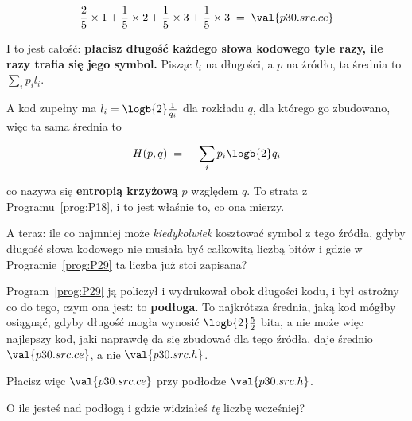 \begin{fr}

\[ \frac25 \times 1 + \frac15 \times 2 + \frac15 \times 3
   + \frac15 \times 3 \;=\; \val{p30.src.ce} \]

I to jest całość: \textbf{płacisz długość każdego słowa kodowego tyle razy,
ile razy trafia się jego symbol.} Pisząc $l_i$ na długości, a $p$ na źródło,
ta średnia to $\sum_i p_i l_i$.

A kod zupełny ma $l_i = \logb{2}\frac{1}{q_i}$ dla rozkładu $q$, dla którego
go zbudowano, więc ta sama średnia to

\[ H(p, q) \;=\; -\sum_i p_i \logb{2} q_i \]

co nazywa się \textbf{entropią krzyżową} $p$ względem $q$. To strata z
Programu~\ref{prog:P18}, i to jest właśnie to, co ona mierzy.

A teraz: ile co najmniej może \emph{kiedykolwiek} kosztować symbol z tego
źródła, gdyby długość słowa kodowego nie musiała być całkowitą liczbą bitów
\dash{} i gdzie w Programie~\ref{prog:P29} ta liczba już stoi zapisana?
\dotline
\nextframe
\end{fr}

\begin{fr}

Program~\ref{prog:P29} ją policzył i wydrukował obok długości kodu, i był
ostrożny co do tego, czym ona jest: to \textbf{podłoga}. To najkrótsza
średnia, jaką kod mógłby osiągnąć, gdyby długość mogła wynosić
$\logb{2}\frac{5}{2}$ bita, a nie może \dash{} więc najlepszy kod, jaki
naprawdę da się zbudować dla tego źródła, daje średnio $\val{p30.src.ce}$, a
nie $\val{p30.src.h}$.

Płacisz więc $\val{p30.src.ce}$ przy podłodze $\val{p30.src.h}$.

O ile jesteś nad podłogą i gdzie widziałeś \emph{tę} liczbę wcześniej?
\dotline
\nextframe
\end{fr}

